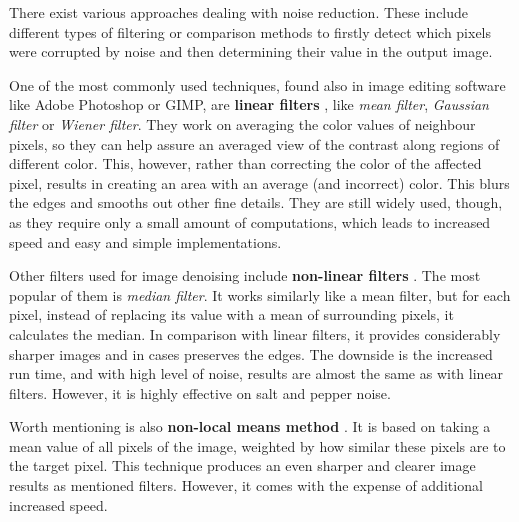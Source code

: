 There exist various approaches dealing with noise reduction. These include different types of filtering or comparison methods to firstly detect which pixels were corrupted by noise and then determining their value in the output image.

\begin{description}

\item One of the most commonly used techniques, found also in image editing software like Adobe Photoshop or GIMP, are \textbf{linear filters} \citep{denoisingTechniques}, like \emph{mean filter}, \emph{Gaussian filter} or \emph{Wiener filter}. They work on averaging the color values of neighbour pixels, so they can help assure an averaged view of the contrast along regions of different color. This, however, rather than correcting the color of the affected pixel, results in creating an area with an average (and incorrect) color. This blurs the edges and smooths out other fine details. They are still widely used, though, as they require only a small amount of computations, which leads to increased speed and easy and simple implementations.

\item Other filters used for image denoising include \textbf{non-linear filters} \citep{denoisingTechniques}. The most popular of them is \emph{median filter}. It works similarly like a mean filter, but for each pixel, instead of replacing its value with a mean of surrounding pixels, it calculates the median. In comparison with linear filters, it provides considerably sharper images and in cases preserves the edges. The downside is the increased run time, and with high level of noise, results are almost the same as with linear filters. However, it is highly effective on salt and pepper noise.

\item Worth mentioning is also \textbf{non-local means method} \citep{nonLocalMeans}. It is based on taking a mean value of all pixels of the image, weighted by how similar these pixels are to the target pixel. This technique produces an even sharper and clearer image results as mentioned filters. However, it comes with the expense of additional increased speed.

\end{description}

